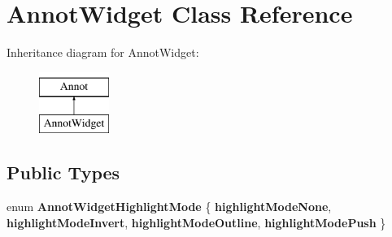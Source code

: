 \hypertarget{class_annot_widget}{}\section{Annot\+Widget Class Reference}
\label{class_annot_widget}
Inheritance diagram for Annot\+Widget\+:\begin{figure}[H]
\begin{center}
\leavevmode
\includegraphics[height=2.000000cm]{class_annot_widget}
\end{center}
\end{figure}
\subsection*{Public Types}
\begin{DoxyCompactItemize}
\item 
\mbox{\label{class_annot_widget_af5809dbac86452f13599d9d8f079c88e}} 
enum {\bfseries Annot\+Widget\+Highlight\+Mode} \{ {\bfseries highlight\+Mode\+None}, 
{\bfseries highlight\+Mode\+Invert}, 
{\bfseries highlight\+Mode\+Outline}, 
{\bfseries highlight\+Mode\+Push}
 \}
\end{DoxyCompactItemize}
